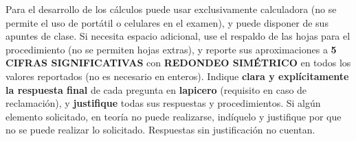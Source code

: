 \documentclass[12pt]{article}
\begin{document}
Para el desarrollo de los cálculos puede usar exclusivamente calculadora (no se permite el uso de portátil o celulares en el examen), y
puede disponer de sus apuntes de clase. %
Si necesita espacio adicional, use el respaldo de las hojas para el procedimiento (no se permiten hojas extras), y reporte sus aproximaciones a \textbf{5 CIFRAS SIGNIFICATIVAS} con \textbf{REDONDEO SIMÉTRICO} en todos los valores reportados (no es necesario en enteros).
Indique \textbf{clara y explícitamente la respuesta final} de cada pregunta en \textbf{lapicero} (requisito en caso de reclamación), y \textbf{justifique} todas sus respuestas y procedimientos. Si algún elemento solicitado, en teoría no puede realizarse, indíquelo y justifique por que no se puede realizar lo solicitado. Respuestas sin justificación no cuentan.
\end{document}
